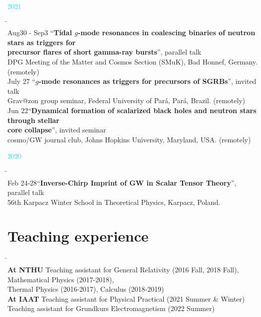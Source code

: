 \documentclass[11pt,a4paper,sans]{moderncv}
\begin{document}
{\Large \textcolor{cyan}{2021}}
\begin{tabbing}
\hspace*{2.3cm} \= \hspace*{10cm} \\[-3ex]
Aug30 - Sep3 \> ``\textbf{Tidal $g$-mode resonances in coalescing binaries of neutron stars as triggers for}\\
\> \textbf{precursor flares of short gamma-ray bursts}'', parallel talk\\ 
\> DPG Meeting of the Matter and Cosmos Section (SMuK), Bad Honnef, Germany. (remotely)\\
%
July 27 \>``\textbf{$g$-mode resonances as triggers for precursors of SGRBs}'', invited talk\\ 
\> Grav@zon group seminar, Federal University of Pará, Pará, Brazil. (remotely) \\
%
Jun 22\>``\textbf{Dynamical formation of scalarized black holes and neutron stars through stellar}\\
\> \textbf{core collapse}'', invited seminar\\ 
\> cosmo/GW journal club, Johns Hopkins University, Maryland, USA. (remotely)
\end{tabbing}

{\Large \textcolor{cyan}{2020}}
\begin{tabbing}
\hspace*{2.3cm} \= \hspace*{10cm} \\[-3ex]
Feb 24-28\>``\textbf{Inverse-Chirp Imprint of GW in Scalar Tensor Theory}'', parallel talk\\ 
\>56th Karpacz Winter School in Theoretical Physics, Karpacz, Poland.
\end{tabbing}

\section{Teaching experience}
\begin{tabbing}
\hspace*{2.3cm} \= \hspace*{10cm} \\[-3ex]
\textbf{At NTHU} \> Teaching assistant for General Relativity (2016 Fall, 2018 Fall), Mathematical Physics (2017-2018),\\
\> Thermal Physics (2016-2017), Calculus (2018-2019) \\
\textbf{At IAAT} \> Teaching assistant for Physical Practical (2021 Summer \& Winter)\\
\> Teaching assistant for Grundkurs Electromagnetism (2022 Summer)
\end{tabbing}
\end{document}

